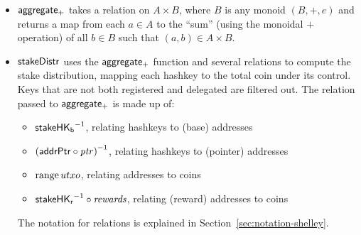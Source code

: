 \begin{itemize}
\item $\mathsf{aggregate_{+}}$ takes a relation on $A\times B$, where $B$ is any
  monoid $(B,+,e)$ and returns a map from each $a\in A$ to the ``sum'' (using
  the monoidal $+$ operation) of all $b\in B$ such that $(a, b)\in A\times B$.
\item $\mathsf{stakeDistr}$ uses the $\mathsf{aggregate_{+}}$ function and several relations to
    compute the stake distribution, mapping each hashkey to the total coin under its control.
    Keys that are not both registered and delegated are filtered out.
    The relation passed to $\mathsf{aggregate_{+}}$ is made up of:
    \begin{itemize}
      \item $\mathsf{stakeHK_b}^{-1}$, relating hashkeys to (base) addresses
      \item $\left(\mathsf{addrPtr}\circ\mathit{ptr}\right)^{-1}$, relating hashkeys to (pointer)
        addresses
      \item $\operatorname{range}{utxo}$, relating addresses to coins
      \item $\mathsf{stakeHK_r}^{-1}\circ\mathit{rewards}$, relating (reward) addresses to coins
    \end{itemize}
    The notation for relations is explained in Section~\ref{sec:notation-shelley}.
\end{itemize}

